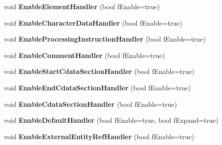 \begin{DoxyCompactItemize}
\item 
\hypertarget{class_c_expat_impl_acf2e51e7fb9183a180cd8ffdc8bebb3e}{void {\bfseries Enable\+Element\+Handler} (bool f\+Enable=true)}\label{class_c_expat_impl_acf2e51e7fb9183a180cd8ffdc8bebb3e}

\item 
\hypertarget{class_c_expat_impl_a9710ebe6b824dd35fc3cffe748df9749}{void {\bfseries Enable\+Character\+Data\+Handler} (bool f\+Enable=true)}\label{class_c_expat_impl_a9710ebe6b824dd35fc3cffe748df9749}

\item 
\hypertarget{class_c_expat_impl_ad645eca4eb59c0faa6425a20f6a05595}{void {\bfseries Enable\+Processing\+Instruction\+Handler} (bool f\+Enable=true)}\label{class_c_expat_impl_ad645eca4eb59c0faa6425a20f6a05595}

\item 
\hypertarget{class_c_expat_impl_a552c6281c12de7a74e17df3faf38723b}{void {\bfseries Enable\+Comment\+Handler} (bool f\+Enable=true)}\label{class_c_expat_impl_a552c6281c12de7a74e17df3faf38723b}

\item 
\hypertarget{class_c_expat_impl_a27ad6538ae5e773fc2d6af0ff8441582}{void {\bfseries Enable\+Start\+Cdata\+Section\+Handler} (bool f\+Enable=true)}\label{class_c_expat_impl_a27ad6538ae5e773fc2d6af0ff8441582}

\item 
\hypertarget{class_c_expat_impl_a3390e7ef5fc411b0d76da2cc3528231d}{void {\bfseries Enable\+End\+Cdata\+Section\+Handler} (bool f\+Enable=true)}\label{class_c_expat_impl_a3390e7ef5fc411b0d76da2cc3528231d}

\item 
\hypertarget{class_c_expat_impl_ad0b0fa3d2c7604d0af6f8b4662d17c38}{void {\bfseries Enable\+Cdata\+Section\+Handler} (bool f\+Enable=true)}\label{class_c_expat_impl_ad0b0fa3d2c7604d0af6f8b4662d17c38}

\item 
\hypertarget{class_c_expat_impl_a79ccb0e194a01a82e67f0d75a05ff4dc}{void {\bfseries Enable\+Default\+Handler} (bool f\+Enable=true, bool f\+Expand=true)}\label{class_c_expat_impl_a79ccb0e194a01a82e67f0d75a05ff4dc}

\item 
\hypertarget{class_c_expat_impl_a792a4fedfcde46489c261e692eea54f4}{void {\bfseries Enable\+External\+Entity\+Ref\+Handler} (bool f\+Enable=true)}\label{class_c_expat_impl_a792a4fedfcde46489c261e692eea54f4}


\end{DoxyCompactItemize}
